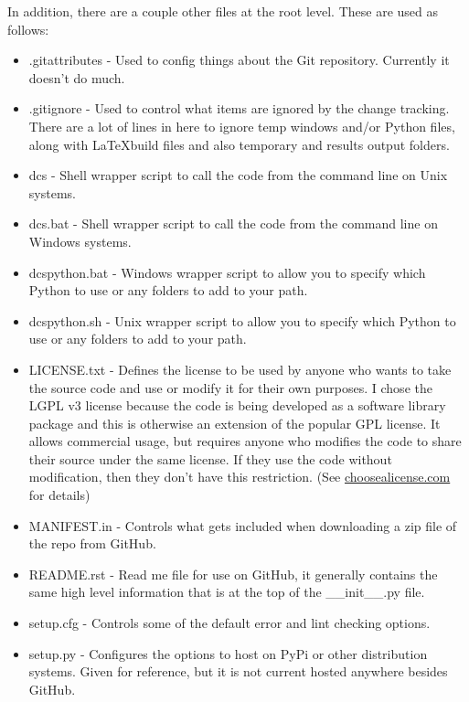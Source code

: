 \documentclass[12pt]{article}
\begin{document}
In addition, there are a couple other files at the root level.  These are used as follows:
\begin{itemize}
    \setlength{\itemsep}{0pt}
    \setlength{\parskip}{0pt}
    \setlength{\parsep}{0pt}
    \item .gitattributes - Used to config things about the Git repository.  Currently it doesn't do much.
    \item .gitignore - Used to control what items are ignored by the change tracking.  There are a lot of lines in here to ignore temp windows and/or Python files, along with \LaTeX build files and also temporary and results output folders.
    \item dcs - Shell wrapper script to call the code from the command line on Unix systems.
    \item dcs.bat - Shell wrapper script to call the code from the command line on Windows systems.
    \item dcspython.bat - Windows wrapper script to allow you to specify which Python to use or any folders to add to your path.
    \item dcspython.sh - Unix wrapper script to allow you to specify which Python to use or any folders to add to your path.
    \item LICENSE.txt - Defines the license to be used by anyone who wants to take the source code and use or modify it for their own purposes.  I chose the LGPL v3 license because the code is being developed as a software library package and this is otherwise an extension of the popular GPL license.  It allows commercial usage, but requires anyone who modifies the code to share their source under the same license.  If they use the code without modification, then they don't have this restriction.  (See \href{http://choosealicense.com/}{choosealicense.com} for details)
    \item MANIFEST.in - Controls what gets included when downloading a zip file of the repo from GitHub.
    \item README.rst - Read me file for use on GitHub, it generally contains the same high level information that is at the top of the \_\_init\_\_.py file.
    \item setup.cfg - Controls some of the default error and lint checking options.
    \item setup.py - Configures the options to host on PyPi or other distribution systems.  Given for reference, but it is not current hosted anywhere besides GitHub.
\end{itemize}
\end{document}
